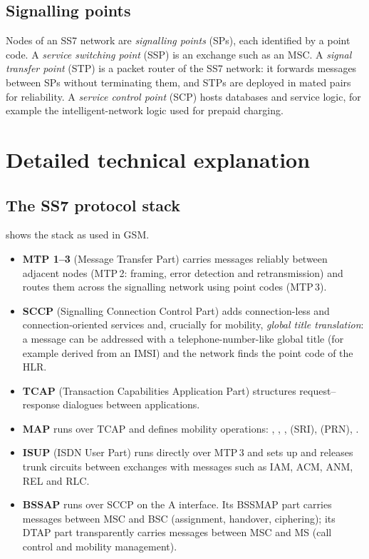 \documentclass[11pt,a4paper]{article}
\begin{document}
\subsection{Signalling points}
Nodes of an SS7 network are \emph{signalling points} (SPs), each identified by a point
code. A \emph{service switching point} (SSP) is an exchange such as an MSC. A
\emph{signal transfer point} (STP) is a packet router of the SS7 network: it forwards
messages between SPs without terminating them, and STPs are deployed in mated pairs for
reliability. A \emph{service control point} (SCP) hosts databases and service logic,
for example the intelligent-network logic used for prepaid charging.

\section{Detailed technical explanation}

\subsection{The SS7 protocol stack}
 shows the stack as used in GSM.
\begin{itemize}
  \item \textbf{MTP 1--3} (Message Transfer Part) carries messages reliably between
        adjacent nodes (MTP\,2: framing, error detection and retransmission) and routes them
        across the signalling network using point codes (MTP\,3).
  \item \textbf{SCCP} (Signalling Connection Control Part) adds connection-less and
        connection-oriented services and, crucially for mobility, \emph{global title
        translation}: a message can be addressed with a telephone-number-like global title
        (for example derived from an IMSI) and the network finds the point code of the HLR.
  \item \textbf{TCAP} (Transaction Capabilities Application Part) structures
        request--response dialogues between applications.
  \item \textbf{MAP} \cite{ts29002} runs over TCAP and defines mobility operations:
        , , ,
         (SRI),  (PRN),
        .
  \item \textbf{ISUP} (ISDN User Part) runs directly over MTP\,3 and sets up and releases
        trunk circuits between exchanges with messages such as IAM, ACM, ANM, REL and RLC.
  \item \textbf{BSSAP} runs over SCCP on the A interface. Its BSSMAP part carries messages
        between MSC and BSC (assignment, handover, ciphering); its DTAP part transparently
        carries messages between MSC and MS (call control and mobility management).
\end{itemize}
\end{document}
